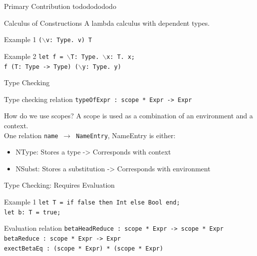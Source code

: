 \documentclass[aspectratio=43]{beamer}
\begin{document}
\begin{frame}{Primary Contribution}
	todododododo
\end{frame}

\begin{frame}[fragile]{Calculus of Constructions}
	A lambda calculus with dependent types.
	
	\begin{exampleblock}{Example 1}
		\texttt{($\backslash$v: Type. v) T}
	\end{exampleblock}

	\begin{exampleblock}{Example 2}
		\texttt{let f = $\backslash$T: Type. $\backslash$x: T. x; \\
f (T: Type -> Type) ($\backslash$y: Type. y)
		}
	\end{exampleblock}
\end{frame}

\begin{frame}[fragile]{Type Checking}
	\begin{block}{Type checking relation}
		\texttt{typeOfExpr : scope * Expr -> Expr}
	\end{block}
	\begin{block}{How do we use scopes?}
		A scope is used as a combination of an environment and a context.\\
		One relation \texttt{name $\rightarrow$ NameEntry}, NameEntry is either:
		\begin{itemize}
			\item NType: Stores a type -> Corresponds with context
			\item NSubst: Stores a substitution -> Corresponds with environment
		\end{itemize}
	\end{block}
\end{frame}

\begin{frame}[fragile]{Type Checking: Requires Evaluation}
	\begin{exampleblock}{Example 1}
		\texttt{let T = if false then Int else Bool end;\\let b: T = true;}
	\end{exampleblock}
	\begin{block}{Evaluation relation} 
		\texttt{betaHeadReduce : scope * Expr -> scope * Expr} \\
		\texttt{betaReduce : scope * Expr -> Expr} \\
		\texttt{exectBetaEq : (scope * Expr) * (scope * Expr)}
	\end{block}
\end{frame}
\end{document}
